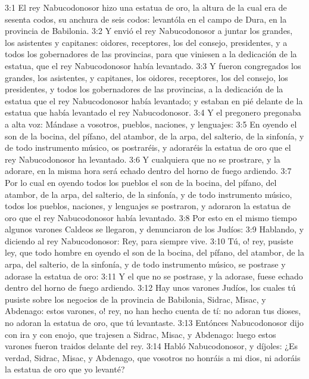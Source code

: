 


3:1 El rey Nabucodonosor hizo una estatua de oro, la altura de la cual era de sesenta codos, su anchura de seis codos: levantóla en el campo de Dura, en la provincia de Babilonia.
3:2 Y envió el rey Nabucodonosor a juntar los grandes, los asistentes y capitanes: oidores, receptores, los del consejo, presidentes, y a todos los gobernadores de las provincias, para que viniesen a la dedicación de la estatua, que el rey Nabucodonosor había levantado.
3:3 Y fueron congregados los grandes, los asistentes, y capitanes, los oidores, receptores, los del consejo, los presidentes, y todos los gobernadores de las provincias, a la dedicación de la estatua que el rey Nabucodonosor había levantado; y estaban en pié delante de la estatua que había levantado el rey Nabucodonosor.
3:4 Y el pregonero pregonaba a alta voz: Mándase a vosotros, pueblos, naciones, y lenguajes:
3:5 En oyendo el son de la bocina, del pífano, del atambor, de la arpa, del salterio, de la sinfonía, y de todo instrumento músico, os postraréis, y adoraréis la estatua de oro que el rey Nabucodonosor ha levantado.
3:6 Y cualquiera que no se prostrare, y la adorare, en la misma hora será echado dentro del horno de fuego ardiendo.
3:7 Por lo cual en oyendo todos los pueblos el son de la bocina, del pífano, del atambor, de la arpa, del salterio, de la sinfonía, y de todo instrumento músico, todos los pueblos, naciones, y lenguajes se postraron, y adoraron la estatua de oro que el rey Nabucodonosor había levantado.
3:8 Por esto en el mismo tiempo algunos varones Caldeos se llegaron, y denunciaron de los Judíos:
3:9 Hablando, y diciendo al rey Nabucodonosor: Rey, para siempre vive.
3:10 Tú, o! rey, pusiste ley, que todo hombre en oyendo el son de la bocina, del pífano, del atambor, de la arpa, del salterio, de la sinfonía, y de todo instrumento músico, se postrase y adorase la estatua de oro:
3:11 Y el que no se postrase, y la adorase, fuese echado dentro del horno de fuego ardiendo.
3:12 Hay unos varones Judíos, los cuales tú pusiste sobre los negocios de la provincia de Babilonia, Sidrac, Misac, y Abdenago: estos varones, o! rey, no han hecho cuenta de tí: no adoran tus dioses, no adoran la estatua de oro, que tú levantaste.
3:13 Entónces Nabucodonosor dijo con ira y con enojo, que trajesen a Sidrac, Misac, y Abdenago: luego estos varones fueron traidos delante del rey.
3:14 Habló Nabucodonosor, y díjoles: ¿Es verdad, Sidrac, Misac, y Abdenago, que vosotros no honráis a mi dios, ni adoráis la estatua de oro que yo levanté?
